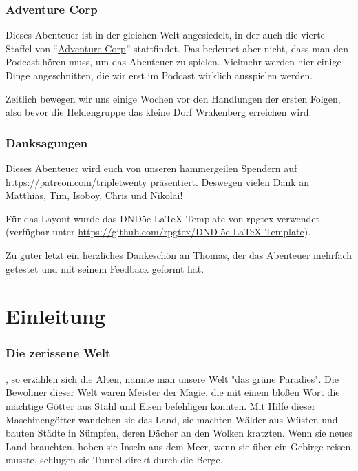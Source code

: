 \subsection{Adventure Corp}

Dieses Abenteuer ist in der gleichen Welt angesiedelt, in der auch die vierte Staffel von ``\href{https://tripletwenty.net/2020/01/07/adventure-corp-s4e01/}{Adventure Corp}'' stattfindet. Das bedeutet aber nicht, dass man den Podcast hören muss, um das Abenteuer zu spielen. Vielmehr werden hier einige Dinge angeschnitten, die wir erst im Podcast wirklich ausspielen werden.

Zeitlich bewegen wir uns einige Wochen vor den Handlungen der ersten Folgen, also bevor die Heldengruppe das kleine Dorf Wrakenberg erreichen wird.

\subsection{Danksagungen}

Dieses Abenteuer wird euch von unseren hammergeilen Spendern auf \url{https://patreon.com/tripletwenty} präsentiert. Deswegen vielen Dank an Matthias, Tim, Isoboy, Chris und Nikolai!

Für das Layout wurde das DND5e-LaTeX-Template von rpgtex verwendet (verfügbar unter \url{https://github.com/rpgtex/DND-5e-LaTeX-Template}).

Zu guter letzt ein herzliches Dankeschön an Thomas, der das Abenteuer mehrfach getestet und mit seinem Feedback geformt hat.

\chapter*{Einleitung}

\subsection{Die zerissene Welt}

, so erzählen sich die Alten, nannte man unsere Welt "das grüne Paradies". Die Bewohner dieser Welt waren Meister der Magie, die mit einem bloßen Wort die mächtige Götter aus Stahl und Eisen befehligen konnten. Mit Hilfe dieser Maschinengötter wandelten sie das Land, sie machten Wälder aus Wüsten und bauten Städte in Sümpfen, deren Dächer an den Wolken kratzten. Wenn sie neues Land brauchten, hoben sie Inseln aus dem Meer, wenn sie über ein Gebirge reisen musste, schlugen sie Tunnel direkt durch die Berge.

